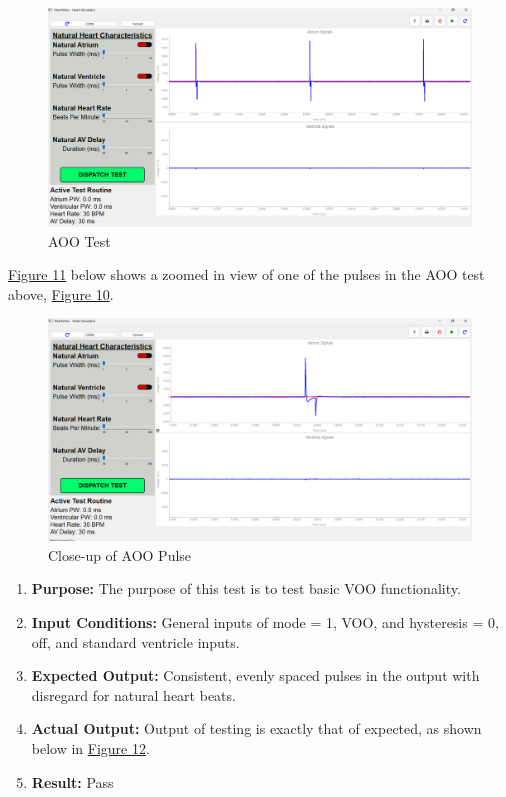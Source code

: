 \documentclass{article}
\newcounter{subsubsubsection}[subsubsection]
\begin{document}
\begin{tcolorbox}
    \begin{figure}[H]        
        \label{AOOtest}
        \includegraphics[width=\textwidth]{AOOtest1.png}
        \caption{AOO Test}
    \end{figure}
\end{tcolorbox}

\newpage
\hyperref[AOOpulse]{Figure 11} below shows a zoomed in view of one of the pulses in the AOO test above, \hyperref[AOOtest]{Figure 10}. 

\begin{tcolorbox}
    \begin{figure}[H]
        \label{AOOpulse}
        \includegraphics[width=\textwidth]{AOOPulseClose.png}
        \caption{Close-up of AOO Pulse}
    \end{figure}
\end{tcolorbox}

\newpage
{}

\begin{enumerate}[label=]
   \item \textbf{Purpose:} The purpose of this test is to test basic VOO functionality.
   \item \textbf{Input Conditions:} General inputs of mode = 1, VOO, and hysteresis = 0, off, and standard 
   ventricle inputs. 
   \item \textbf{Expected Output:} Consistent, evenly spaced pulses in the output with disregard for natural heart beats.
   \item \textbf{Actual Output:} Output of testing is exactly that of expected, as shown below in \hyperref[VOOtest]{Figure 12}.
   \item \textbf{Result:} Pass
\end{enumerate}
\end{document}
